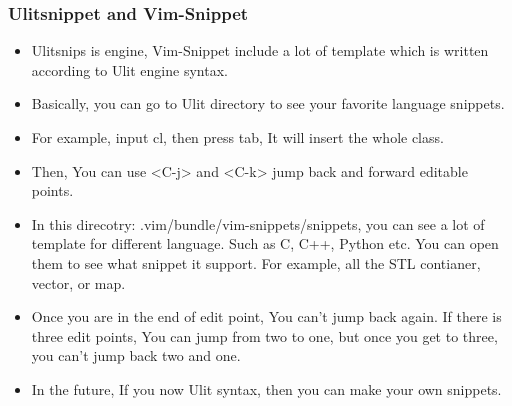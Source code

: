 \documentclass[a4paper,12pt,twoside]{book}
\begin{document}
\subsubsection{Ulitsnippet and Vim-Snippet}
\begin{itemize}
\item Ulitsnips is engine, Vim-Snippet include a lot of template which is written according to Ulit engine syntax. 

\item Basically, you can go to Ulit directory to see your favorite language snippets. 

\item For example, input cl, then press tab, It will insert the whole class. 

\item Then, You can use <C-j> and <C-k> jump back and forward editable points. 

\item In this direcotry: .vim/bundle/vim-snippets/snippets, you can see a lot of template for different language. Such as C, C++, Python etc. You can open them to see what snippet it support. For example, all the STL contianer, vector, or map. 

\item Once you are in the end of edit point, You can't jump back again. If there is three edit points, You can jump from two to one, but once you get to three, you can't jump back two and one. 

\item In the future, If you now Ulit syntax, then you can make your own snippets. 

\end{itemize}
\end{document}

